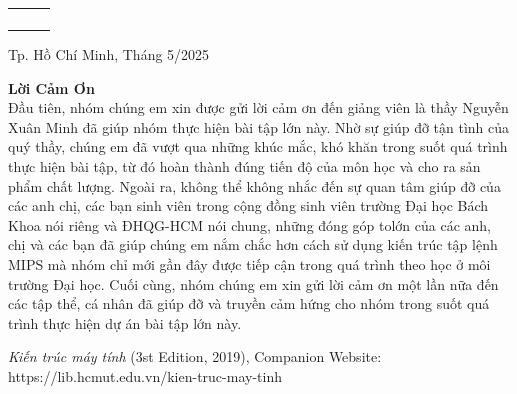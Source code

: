 \documentclass[a4paper]{article}
\theoremstyle{definition}
\begin{document}
\begin{titlepage}
\begin{table}[h]
\begin{tabular}{rrl}
\hspace{0.5 cm} & \color{black}{SV thực hiện:} & \color{black}{TRẦN MINH DƯƠNG- 2310609}\\ &\color{black} &\color{black}{PHẠM CÔNG VÕ - 2313946}\\

\hspace{3.5 cm} & \color{black}{Lớp:} & \color{black}{L02}\\
&\color{black}{Nhóm:} &\color{black}{21}\\

\end{tabular}
\end{table}
\vspace{5cm}
\begin{center}
{\footnotesize \hspace{1cm} \large Tp. Hồ Chí Minh, Tháng 5/2025}
\end{center}
\end{titlepage}





\newpage
\Large \textbf{Lời Cảm Ơn} \small \\

\large Đầu tiên, nhóm chúng em xin được gửi lời cảm ơn đến giảng viên là thầy Nguyễn Xuân Minh đã giúp
nhóm thực hiện bài tập lớn này. Nhờ sự giúp đỡ tận tình của quý thầy, chúng em đã vượt qua những
khúc mắc, khó khăn trong suốt quá trình thực hiện bài tập, từ đó hoàn thành đúng tiến độ của môn học
và cho ra sản phẩm chất lượng.
Ngoài ra, không thể không nhắc đến sự quan tâm giúp đỡ của các anh chị, các bạn sinh viên trong
cộng đồng sinh viên trường Đại học Bách Khoa nói riêng và ĐHQG-HCM nói chung, những đóng góp
tolớn của các anh, chị và các bạn đã giúp chúng em nắm chắc hơn cách sử dụng kiến trúc tập lệnh MIPS
mà nhóm chỉ mới gần đây được tiếp cận trong quá trình theo học ở môi trường Đại học.
Cuối cùng, nhóm chúng em xin gửi lời cảm ơn một lần nữa đến các tập thể, cá nhân đã giúp đỡ và
truyền cảm hứng cho nhóm trong suốt quá trình thực hiện dự án bài tập lớn này. 

\newpage
\tableofcontents
\newpage
\listoffigures
\newpage







\newpage
{}
\begin{thebibliography}{99999}
 {\em Kiến trúc máy tính}   (3st Edition, 2019), Companion Website:
https://lib.hcmut.edu.vn/kien-truc-may-tinh

\end{thebibliography}
\end{document}
